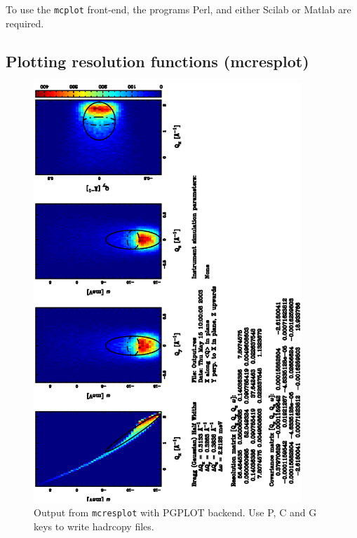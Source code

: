 To use the \verb+mcplot+ front-end, the programs Perl, and either Scilab or Matlab are required.  


\subsection{Plotting resolution functions (mcresplot)}
\label{s:mcresplot}

\begin{figure}[htb!]
  \begin{center}
    \includegraphics[angle=-90,width=0.9\textwidth]{figures/mcresplot_PGPLOT.ps}
  \end{center}
\caption{Output from \texttt{mcresplot} with PGPLOT backend.
  Use P, C and G keys to write hadrcopy files.}
\label{fig:mcresplot_PGPLOT}
\end{figure}

